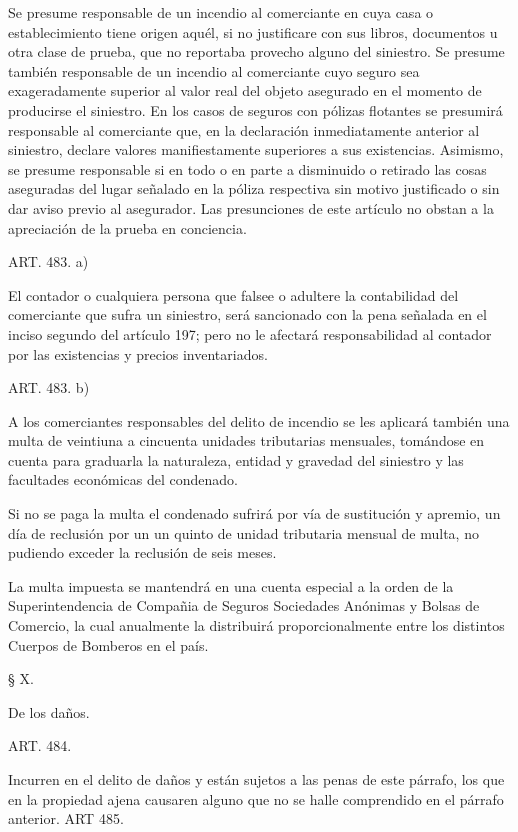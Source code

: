     Se presume responsable de un incendio al comerciante en cuya casa o establecimiento tiene origen aquél, si no justificare con sus libros, documentos u otra clase de prueba, que no reportaba provecho alguno del siniestro.
    Se presume también responsable de un incendio al comerciante cuyo seguro sea exageradamente superior al valor real del objeto asegurado en el momento de producirse el siniestro. En los casos de seguros con pólizas flotantes se presumirá responsable al comerciante que, en la declaración inmediatamente anterior al siniestro, declare valores manifiestamente superiores a sus existencias. Asimismo, se presume responsable si en todo o en parte a disminuido o retirado las cosas aseguradas del lugar señalado en la póliza respectiva sin motivo justificado o sin dar aviso previo al asegurador.
    Las presunciones de este artículo no obstan a la apreciación de la prueba en conciencia.

    ART. 483. a)

    El contador o cualquiera persona que falsee o adultere la contabilidad del comerciante que sufra un siniestro, será sancionado con la pena señalada en el inciso segundo del artículo 197; pero no le afectará responsabilidad al contador por las existencias y precios inventariados.

    ART. 483. b)

    A los comerciantes responsables del delito de incendio se les aplicará también una multa de veintiuna a cincuenta unidades tributarias mensuales, tomándose en cuenta para graduarla la naturaleza, entidad y gravedad del siniestro y las facultades económicas del condenado.

    Si no se paga la multa el condenado sufrirá por vía de sustitución y apremio, un día de reclusión por un un quinto de unidad tributaria mensual de multa, no pudiendo exceder la reclusión de seis meses.

    La multa impuesta se mantendrá en una cuenta especial a la orden de la Superintendencia de Compañia de Seguros Sociedades Anónimas y Bolsas de Comercio, la cual anualmente la distribuirá proporcionalmente entre los distintos Cuerpos de Bomberos en el país.

    § X.

    De los daños.





    ART. 484.

    Incurren en el delito de daños y están sujetos a las penas de este párrafo, los que en la propiedad ajena causaren alguno que no se halle comprendido en el párrafo anterior.
    ART 485.


